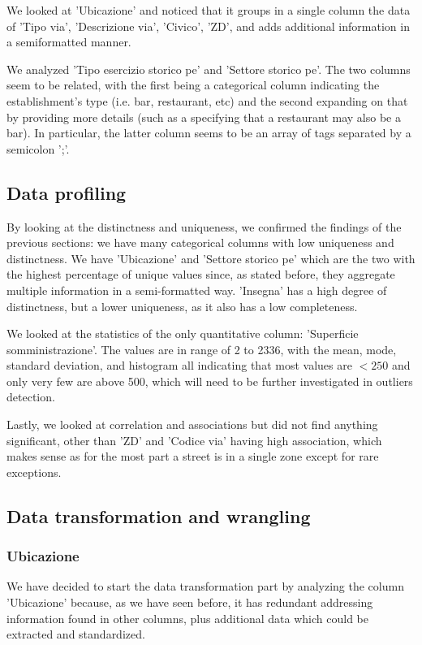 \documentclass{article}
\begin{document}
We looked at 'Ubicazione' and noticed that it groups in a single column the data of 'Tipo via', 'Descrizione via', 'Civico', 'ZD', and adds additional information in a semiformatted manner.

We analyzed 'Tipo esercizio storico pe' and 'Settore storico pe'. The two columns seem to be related, with the first being a categorical column indicating the establishment's type (i.e. bar, restaurant, etc) and the second expanding on that by providing more details (such as a specifying that a restaurant may also be a bar). In particular, the latter column seems to be an array of tags separated by a semicolon ';'.

\subsection{Data profiling}
By looking at the distinctness and uniqueness, we confirmed the findings of the previous sections: we have many categorical columns with low uniqueness and distinctness. We have 'Ubicazione' and 'Settore storico pe' which are the two with the highest percentage of unique values since, as stated before, they aggregate multiple information in a semi-formatted way.
'Insegna' has a high degree of distinctness, but a lower uniqueness, as it also has a low completeness.

We looked at the statistics of the only quantitative column: 'Superficie somministrazione'. The values are in range of 2 to 2336, with the mean, mode, standard deviation, and histogram all indicating that most values are $< 250$ and only very few are above 500, which will need to be further investigated in outliers detection.

Lastly, we looked at correlation and associations but did not find anything significant, other than 'ZD' and 'Codice via' having high association, which makes sense as for the most part a street is in a single zone except for rare exceptions.

\subsection{Data transformation and wrangling}
\subsubsection{Ubicazione}
We have decided to start the data transformation part by analyzing the column 'Ubicazione' because, as we have seen before, it has redundant addressing information found in other columns, plus additional data which could be extracted and standardized.
\end{document}
